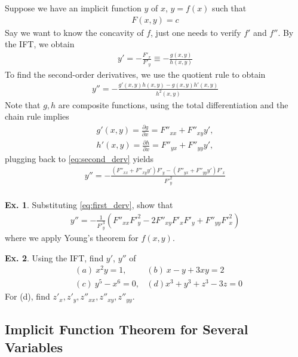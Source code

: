 \documentclass[10pt,a4paper]{book}
\theoremstyle{definition}\newtheorem{definition}{Definition}
\theoremstyle{definition}\newtheorem{fact}{Fact}
\theoremstyle{definition}\newtheorem{ex}{Ex.}
\theoremstyle{definition}\newtheorem{project}{Project}
\theoremstyle{definition}\newtheorem{problem}{Problem}
\theoremstyle{definition}\newtheorem{example}{Example}
\numberwithin{theorem}{chapter}
\numberwithin{corollary}{chapter}
\numberwithin{assumption}{chapter}
\numberwithin{definition}{chapter}
\numberwithin{prop}{chapter}
\numberwithin{notation}{chapter}
\numberwithin{problem}{chapter}
\numberwithin{example}{chapter}
\numberwithin{fact}{chapter}
\numberwithin{ex}{chapter}
\begin{document}
	Suppose we have an implicit function $y$ of $x$, $y=f(x)$ such that
	\begin{align*}
		F(x,y) = c 
	\end{align*}
	Say we want to know the concavity of $f$, just one needs to verify $f'$ and $f''$. By the IFT, we obtain
	\begin{align}
		y' = - \frac{F'_x}{F'_y} \equiv - \frac{g(x,y)}{h(x,y)}  \label{eq:first_derv} 
	\end{align}
	To find the second-order derivatives, we use the quotient rule to obtain
	\begin{align}
		y'' = - \frac{g'(x,y) h(x,y) - g(x,y) h'(x,y)}{h^2(x,y)} \label{eq:second_derv} 
	\end{align}
	Note that $g, h$ are composite functions, using the total differentiation and the chain rule implies
	\begin{align*}
		g'(x,y) = \frac{\partial g}{\partial x} =  F''_{xx} + F''_{xy} y', \\
		h'(x,y) = \frac{\partial h}{\partial x} = F''_{yx} + F''_{yy} y',  
	\end{align*}
	plugging back to \eqref{eq:second_derv} yields
	\begin{align*}
		y'' = - \frac{ (F''_{xx} + F''_{xy} y') F'_y - (F''_{yx} + F''_{yy} y') F'_x  }{F'^2_y} \\
	\end{align*}
	
	\begin{ex}
		Substituting \eqref{eq:first_derv}, show that
		\begin{align*}
			y'' = - \frac{1}{F'^3_y} \left( F''_{xx} F'^2_y - 2 F''_{xy} F'_x F'_y + F''_{yy} F'^2_x \right) 
		\end{align*}
		where we apply Young's theorem for $f(x,y)$.
	\end{ex}
	
	
	\begin{ex}
		Using the IFT, find $y'$, $y''$ of
		\begin{align*}
			& (a) \ x^2 y = 1,     & (b) \ x-y+3xy = 2            \\
			& (c) \ y^5 - x^6 = 0, & (d) x^3 + y^3 + z^3 - 3z = 0 
		\end{align*}
		For (d), find $z'_x, z'_y, z''_{xx}, z''_{xy}, z''_{yy}$.
	\end{ex}
	
	\subsection{Implicit Function Theorem for Several Variables}
	
\end{document}
